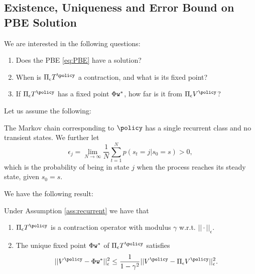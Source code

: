 \subsection{Existence, Uniqueness and Error Bound on PBE Solution}
We are interested in the following questions:
\begin{enumerate}
\item Does the PBE \eqref{eq:PBE} have a solution?
\item When is $\Pi_\epsilon T^\policy$ a contraction, and what is its fixed point?
\item If $\Pi_\epsilon T^\policy$ has a fixed point $\Phi\texttt{w}^*$, how far is it from $\Pi_\epsilon V^\policy$?
\end{enumerate}
Let us assume the following:
\begin{assumption}\label{ass:recurrent}The Markov chain corresponding to $\policy$ has a single recurrent class and no transient states. We further let
$$\epsilon_j = \lim_{N\rightarrow \infty} \frac{1}{N} \sum_{t=1}^N p(s_t=j|s_0=s)>0,$$
which is the probability of being in state $j$ when the process reaches its steady state, given $s_0=s$.
\end{assumption}
We have the following result:
\begin{proposition}\label{prop:PBE_contraction} Under Assumption \ref{ass:recurrent} we have that
\begin{enumerate}
\item $\Pi_\epsilon T^\policy$ is a contraction operator with modulus $\gamma$ w.r.t. $||\cdot||_\epsilon$.
\item The unique fixed point $\Phi \texttt{w}^*$ of $\Pi_\epsilon T^\policy$ satisfies
$$||V^\policy - \FtrMtx \weights^*||_\epsilon^2 \le \frac{1}{1-\gamma^2}||V^\policy-\Pi_\epsilon V^\policy||_\epsilon^2.$$
\end{enumerate}
\end{proposition}
